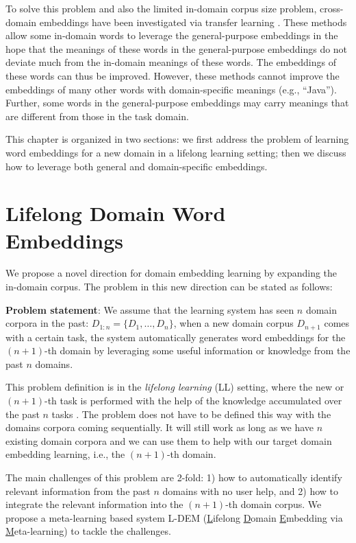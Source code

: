 To solve this problem and also the limited in-domain corpus size problem, cross-domain embeddings have been investigated \cite{bollegala-maehara-kawarabayashi:2015:ACL-IJCNLP,yang-lu-zheng:2017:EMNLP2017,bollegala2017think} via transfer learning \cite{pan2010survey}.
These methods allow some in-domain words to leverage the general-purpose embeddings in the hope that the meanings of these words in the general-purpose embeddings do not deviate much from the in-domain meanings of these words. The embeddings of these words can thus be improved. However, these methods cannot improve the embeddings of many other words with domain-specific meanings (e.g., ``Java'').
Further, some words in the general-purpose embeddings may carry meanings that are different from those in the task domain. 

This chapter is organized in two sections: we first address the problem of learning word embeddings for a new domain in a lifelong learning setting; then we discuss how to leverage both general and domain-specific embeddings. 

\section{Lifelong Domain Word Embeddings}

We propose a novel direction for domain embedding learning by expanding the in-domain corpus. The problem in this new direction can be stated as follows:

\textbf{Problem statement}: We assume that the learning system has seen $n$ domain corpora in the past: $D_{1:n}=\{D_1, \dots, D_n\}$, when a new domain corpus $D_{n+1}$ comes with a certain task, the system automatically generates word embeddings for the $(n+1)$-th domain by leveraging some useful information or knowledge from the past $n$ domains.

This problem definition is in the
\textit{lifelong learning} (LL) setting, where the new or $(n+1)$-th task is performed with the help of the knowledge accumulated over the past $n$ tasks \cite{ChenLiu2016}. 
The problem does not have to be defined this way with the domains corpora coming sequentially. It will still work as long as we have $n$ existing domain corpora and we can use them to help with our target domain embedding learning, i.e., the $(n+1)$-th domain.

The main challenges of this problem are 2-fold:
1) how to automatically identify relevant information from the past $n$ domains with no user help, and 2) how to integrate the relevant information into the $(n+1)$-th domain corpus. We propose a meta-learning based system L-DEM (\underline{L}ifelong \underline{D}omain \underline{E}mbedding via \underline{M}eta-learning) to tackle the challenges.

